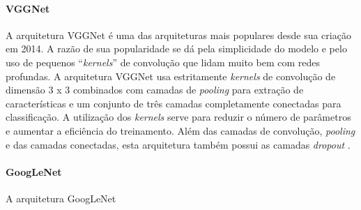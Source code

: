 \paragraph{VGGNet} A arquitetura VGGNet é uma das arquiteturas mais populares desde sua criação em 2014. A razão de sua popularidade se dá pela simplicidade do modelo e pelo uso de pequenos ``\textit{kernels}'' de convolução que lidam muito bem com redes profundas. A arquitetura VGGNet usa estritamente \textit{kernels} de convolução de dimensão 3 x 3 combinados com camadas de \textit{pooling} para extração de características e um conjunto de três camadas completamente conectadas para classificação. A utilização dos \textit{kernels} serve para reduzir o número de parâmetros e aumentar a eficiência do treinamento. Além das camadas de convolução, \textit{pooling} e das camadas conectadas, esta arquitetura também possui as camadas \textit{dropout} \cite{ref:khan}.

\paragraph{GoogLeNet} A arquitetura GoogLeNet 


